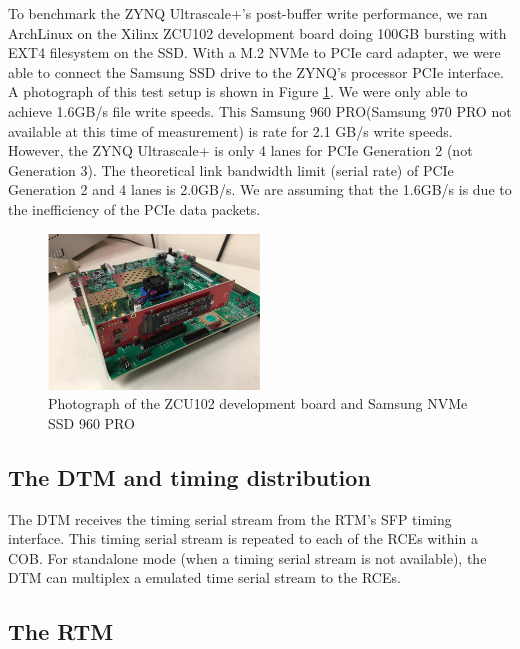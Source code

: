 To benchmark the ZYNQ Ultrascale+'s post-buffer write performance, we ran ArchLinux on the Xilinx ZCU102 development board doing 100GB bursting with EXT4 filesystem on the SSD.  With a M.2 NVMe to PCIe card adapter, we were able to connect the Samsung SSD drive to the ZYNQ's processor PCIe interface.  A photograph of this test setup is shown in Figure \ref{fig:NMVe_performance}. We were only able to achieve 1.6GB/s file write speeds.  This Samsung 960 PRO\cite{Datasheet}(Samsung 970 PRO not available at this time of measurement) is rate for 2.1 GB/s write speeds.  However, the ZYNQ Ultrascale+ is only 4 lanes for PCIe Generation 2 (not Generation 3).  The theoretical link bandwidth limit (serial rate) of PCIe Generation 2 and 4 lanes is 2.0GB/s.  We are assuming that the 1.6GB/s is due to the inefficiency of the PCIe data packets. 

\begin{figure}[tb]
\centering
\includegraphics[width=0.5\textwidth]{images/NMVe_performance.png}
\caption{\label{fig:NMVe_performance} Photograph of the ZCU102 development board and Samsung NVMe SSD 960 PRO}
\end{figure}

\subsection{The DTM and timing distribution}

The DTM receives the timing serial stream from the RTM's SFP timing interface.
This timing serial stream is repeated to each of the RCEs within a COB. 
For standalone mode (when a timing serial stream is not available), the 
DTM can multiplex a emulated time serial stream to the RCEs. 

\subsection{The RTM}

